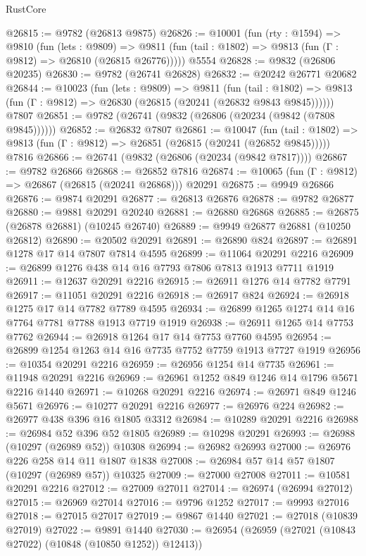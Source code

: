 \begin{lexlean}{RustCore}
\begin{coremodule}
@26815 := @9782 (@26813 @9875)
@26826 := @10001
    (fun (rty : @1594) =>
    @9810
      (fun (lets : @9809) =>
      @9811 (fun (tail : @1802) => @9813 (fun (Γ : @9812) => @26810 (@26815 @26776)))))
    @5554
@26828 := @9832 (@26806 @20235)
@26830 := @9782 (@26741 @26828)
@26832 := @20242 @26771 @20682
@26844 := @10023
    (fun (lets : @9809) =>
    @9811
      (fun (tail : @1802) =>
      @9813 (fun (Γ : @9812) => @26830 (@26815 (@20241 (@26832 @9843 @9845))))))
    @7807
@26851 := @9782 (@26741 (@9832 (@26806 (@20234 (@9842 (@7808 @9845))))))
@26852 := @26832 @7807
@26861 := @10047
    (fun (tail : @1802) => @9813 (fun (Γ : @9812) => @26851 (@26815 (@20241 (@26852 @9845)))))
    @7816
@26866 := @26741 (@9832 (@26806 (@20234 (@9842 @7817))))
@26867 := @9782 @26866
@26868 := @26852 @7816
@26874 := @10065 (fun (Γ : @9812) => @26867 (@26815 (@20241 @26868))) @20291
@26875 := @9949 @26866
@26876 := @9874 @20291
@26877 := @26813 @26876
@26878 := @9782 @26877
@26880 := @9881 @20291 @20240
@26881 := @26880 @26868
@26885 := @26875 (@26878 @26881) (@10245 @26740)
@26889 := @9949 @26877 @26881 (@10250 @26812)
@26890 := @20502 @20291
@26891 := @26890 @824
@26897 := @26891 @1278 @17 @14 @7807 @7814 @4595
@26899 := @11064 @20291 @2216
@26909 := @26899 @1276 @438 @14 @16 @7793 @7806 @7813 @1913 @7711 @1919
@26911 := @12637 @20291 @2216
@26915 := @26911 @1276 @14 @7782 @7791
@26917 := @11051 @20291 @2216
@26918 := @26917 @824
@26924 := @26918 @1275 @17 @14 @7782 @7789 @4595
@26934 := @26899 @1265 @1274 @14 @16 @7764 @7781 @7788 @1913 @7719 @1919
@26938 := @26911 @1265 @14 @7753 @7762
@26944 := @26918 @1264 @17 @14 @7753 @7760 @4595
@26954 := @26899 @1254 @1263 @14 @16 @7735 @7752 @7759 @1913 @7727 @1919
@26956 := @10354 @20291 @2216
@26959 := @26956 @1254 @14 @7735
@26961 := @11948 @20291 @2216
@26969 := @26961 @1252 @849 @1246 @14 @1796 @5671 @2216 @1440
@26971 := @10268 @20291 @2216
@26974 := @26971 @849 @1246 @5671
@26976 := @10277 @20291 @2216
@26977 := @26976 @224
@26982 := @26977 @438 @396 @16 @1805 @3312
@26984 := @10289 @20291 @2216
@26988 := @26984 @52 @396 @52 @1805
@26989 := @10298 @20291
@26993 := @26988 (@10297 (@26989 @52)) @10308
@26994 := @26982 @26993
@27000 := @26976 @226 @258 @14 @11 @1807 @1838
@27008 := @26984 @57 @14 @57 @1807 (@10297 (@26989 @57)) @10325
@27009 := @27000 @27008
@27011 := @10581 @20291 @2216
@27012 := @27009 @27011
@27014 := @26974 (@26994 @27012)
@27015 := @26969 @27014
@27016 := @9796 @1252
@27017 := @9993 @27016
@27018 := @27015 @27017
@27019 := @9867 @1440
@27021 := @27018 (@10839 @27019)
@27022 := @9891 @1440
@27030 := @26954 (@26959 (@27021 (@10843 @27022) (@10848 (@10850 @1252)) @12413))

\end{coremodule}
\end{lexlean}
